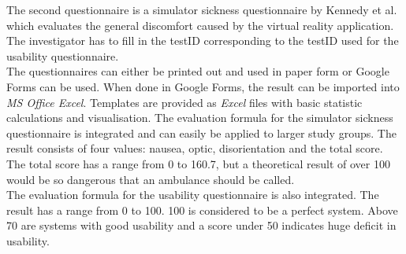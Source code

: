 The second questionnaire is a simulator sickness questionnaire by Kennedy et al. \citep{ssq} which evaluates the general discomfort caused by the virtual reality application. The investigator has to fill in the testID corresponding to the testID used for the usability questionnaire. \\
The questionnaires can either be printed out and used in paper form or Google Forms can be used. When done in Google Forms, the result can be imported into \textit{MS Office Excel}. Templates are  provided as \textit{Excel} files with basic statistic calculations and visualisation. 
The evaluation formula for the simulator sickness questionnaire is integrated and can easily be applied to larger study groups. The result consists of four values: nausea, optic, disorientation and the total score. The total score has a range from 0 to 160.7, but a theoretical result of over 100 would be so dangerous that an ambulance should be called. \\
The evaluation formula for the usability questionnaire is also integrated. The result has a range from 0 to 100. 100 is considered to be a perfect system. Above 70 are systems with good usability and a score under 50 indicates huge deficit in usability. 




\newpage